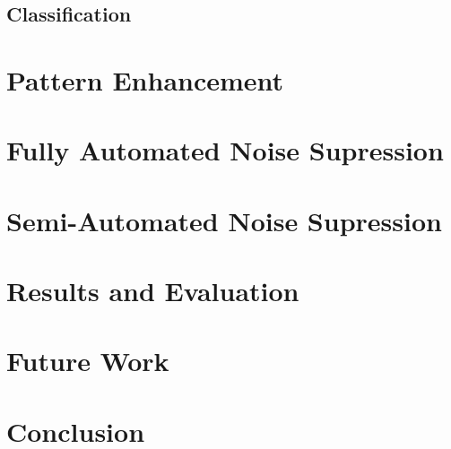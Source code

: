 \documentclass[draft,final]{vutinfth} %
\begin{document}
\section{Classification}

\chapter{Pattern Enhancement}

\chapter{Fully Automated Noise Supression}

\chapter{Semi-Automated Noise Supression}

\chapter{Results and Evaluation}

\chapter{Future Work}

\chapter{Conclusion}


\backmatter


\cleardoublepage %






\end{document}
